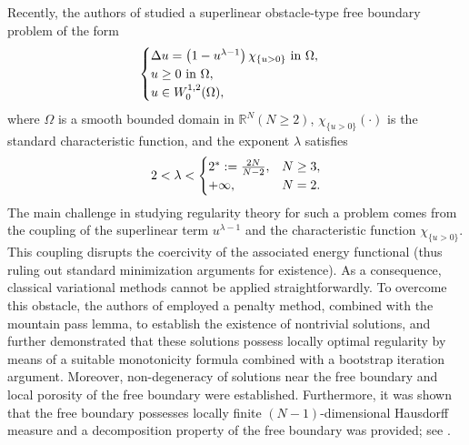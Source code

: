 \documentclass[onecolumn]{autart}
\begin{document}
Recently, the authors of \cite{Wang:2025} studied a superlinear obstacle-type free boundary problem of the form
\begin{align}
	\begin{cases}
		\Delta u = \left(1 - u^{\lambda-1}\right) \chi_{\{u > 0\}}  \text{ in } \Omega, \\
		u \geq 0  \text{ in } \Omega, \\
		u \in W_0^{1,2}(\Omega),
	\end{cases}\notag
\end{align}
where $\Omega  $ is a smooth bounded domain in $ \mathbb{R}^N (N \geq 2)$, $\chi_{\{u>0\}}(\cdot)$ is  the standard characteristic function,
and the exponent $\lambda$ satisfies
\begin{align}
	2 < \lambda <
	\begin{cases}
		2^*:= \frac{2N}{N-2}, & N \geq 3, \\
		+\infty, & N = 2.
	\end{cases}\notag
\end{align}
The main challenge in studying regularity theory for such a problem
comes from the coupling of the superlinear term $u^{\lambda-1}  $ and the characteristic function $ \chi_{\{u > 0\}} $. This coupling disrupts the coercivity of the associated energy functional (thus ruling out standard minimization arguments for existence). As a consequence, classical variational methods cannot be applied straightforwardly. To overcome this obstacle, the authors of  \cite{Wang:2025} employed a penalty method, combined with the mountain pass lemma, to establish the existence of nontrivial solutions, and further demonstrated that these solutions possess locally optimal  regularity by means of a suitable monotonicity formula combined with a bootstrap iteration argument. Moreover, non-degeneracy of solutions near the free boundary and local porosity of the free boundary were established. Furthermore, it was shown that the free boundary possesses locally finite $(N-1)$-dimensional Hausdorff measure  and a decomposition property of the free boundary was provided; see \cite{Wang:2025}.
\end{document}
